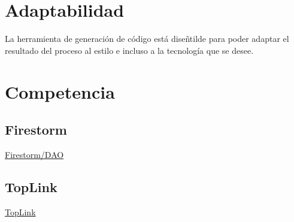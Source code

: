 \documentclass[dvips]{article}
\begin{document}
\section{Adaptabilidad}
La herramienta de generaci\'on de c\'odigo est\'a dise\~ntilde para
poder adaptar el resultado del proceso al estilo e incluso a la
tecnolog\'i{}a que se desee.
\section{Competencia}
\subsection{Firestorm}
\href{http://www.codefutures.com/products/firestorm/}{Firestorm/DAO}
\subsection{TopLink}
\href{http://www.oracle.com/technology/products/ias/toplink/}{TopLink}
\end{document}
